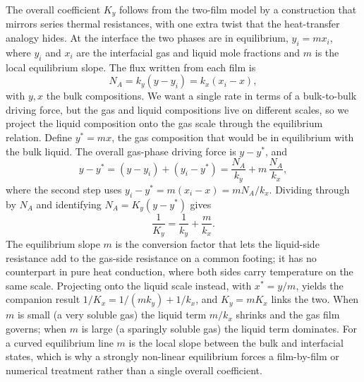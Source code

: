 

\begin{mastery}
The overall coefficient $K_y$ follows from the two-film model by a
construction that mirrors series thermal resistances, with one extra
twist that the heat-transfer analogy hides. At the interface the two
phases are in equilibrium, $y_i = m x_i$, where $y_i$ and $x_i$ are the
interfacial gas and liquid mole fractions and $m$ is the local
equilibrium slope. The flux written from each film is
\[
N_A = k_y (y - y_i) = k_x (x_i - x),
\]
with $y, x$ the bulk compositions. We want a single rate in terms of a
bulk-to-bulk driving force, but the gas and liquid compositions live on
different scales, so we project the liquid composition onto the gas
scale through the equilibrium relation. Define $y^{*} = m x$, the gas
composition that would be in equilibrium with the bulk liquid. The
overall gas-phase driving force is $y - y^{*}$, and
\[
y - y^{*} = (y - y_i) + (y_i - y^{*}) = \frac{N_A}{k_y} +
m\,\frac{N_A}{k_x},
\]
where the second step uses $y_i - y^{*} = m(x_i - x) = m N_A/k_x$.
Dividing through by $N_A$ and identifying $N_A = K_y (y - y^{*})$ gives
\[
\frac{1}{K_y} = \frac{1}{k_y} + \frac{m}{k_x}.
\]
The equilibrium slope $m$ is the conversion factor that lets the
liquid-side resistance add to the gas-side resistance on a common
footing; it has no counterpart in pure heat conduction, where both
sides carry temperature on the same scale. Projecting onto the liquid
scale instead, with $x^{*} = y/m$, yields the companion result
$1/K_x = 1/(m k_y) + 1/k_x$, and $K_y = m K_x$ links the two. When $m$
is small (a very soluble gas) the liquid term $m/k_x$ shrinks and the
gas film governs; when $m$ is large (a sparingly soluble gas) the
liquid term dominates. For a curved equilibrium line $m$ is the local
slope between the bulk and interfacial states, which is why a strongly
non-linear equilibrium forces a film-by-film or numerical treatment
rather than a single overall coefficient.
\end{mastery}


